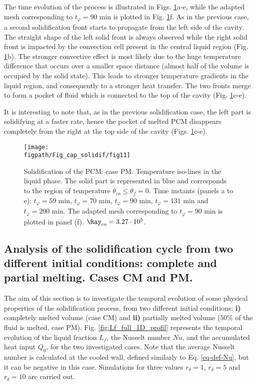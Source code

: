 The time evolution of the process is illustrated in Figs. \ref{fig:evolution_t80}a-e, while the adapted mesh corresponding to $t_{\varphi} = 90$ min is plotted in Fig. \ref{fig:evolution_t80}f. 
As in the previous case, a second  solidification front starts to propagate from the left side of the cavity. 
The straight shape of the left solid front is always observed while the right solid front is impacted by the convection cell present in the central liquid region (Fig. \ref{fig:evolution_t80}b). 
The stronger convective effect is most likely due to the huge temperature difference that occurs over a smaller space distance (almost half of the volume is occupied by the solid state). 
This leads to stronger temperature gradients in the liquid region, and consequently to a stronger heat transfer. 
The two fronts merge to form a pocket of fluid which is connected to the top of the cavity (Fig. \ref{fig:evolution_t80}c-e). 

\noindent It is interesting to  note that, as in the previous solidification case, the left part is solidifying at a faster rate, hence the pocket of melted PCM disappears completely from the right at the top side of the cavity (Figs. \ref{fig:evolution_t80}c-e).
\begin{figure}
	\begin{center}
		\texttt{[image: \\figpath/Fig\_cap\_solidif/fig11]}
	\end{center}
	\caption{Solidification of the PCM: case PM. Temperature iso-lines in the liquid phase. The solid part is represented in blue and corresponds to the region of temperature $\theta_{co} \leq \theta_f=0$. Time instants (panels  a to e): $t_{\varphi} = 59$ min, $t_{\varphi} = 70$ min, $t_{\varphi} = 90$ min, $t_{\varphi} = 131$ min and $t_{\varphi} = 200$ min. The adapted mesh corresponding to $t_{\varphi} = 90$ min is plotted in panel (f).  $ \Ray_{co}=3.27 \cdot 10^5$.}\label{fig:evolution_t80}
\end{figure}

\subsection{Analysis of the solidification cycle from two different initial conditions: complete and partial melting. Cases CM and PM. }
 \label{sec_freezing_full} 

The aim of this section is to investigate the temporal evolution of some physical properties of the solidification process, from two different initial conditions: \textbf{i)} completely melted volume (case CM) and \textbf{ii)} partially melted volume ($50\%$ of the fluid is melted, case PM).  
 Fig. \ref{fig:Lf_full_1D_profil} represents the temporal  evolution of the liquid fraction $L_f$, the Nusselt number $N\!u$, and the accumulated heat input  $Q_0$, for the two investigated cases.
Note that the average Nusselt number is calculated at the cooled wall, defined similarly to Eq. \ref{eq-def-Nu}, but it can be negative in this case. 
Simulations for three values $r_{\delta} = 1$,  $r_{\delta} = 5$ and  $r_{\delta} = 10$ are carried out.

